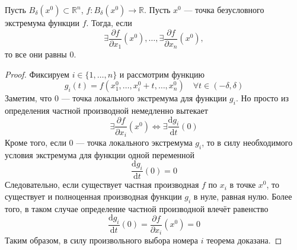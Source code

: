 \documentclass[11pt]{article}
\begin{document}
\begin{theorem}
    Пусть $B_{\delta} (x^0)\subset \mathbb{R}^n$, $f \colon B_{\delta} (x^0)\to \mathbb{R}$. Пусть $x^0$ --- точка безусловного экстремума функции $f$.
    Тогда, если
    \[\exists \frac{\partial f}{\partial x_1} (x^0), \ldots , \exists \frac{\partial f}{\partial x_n}(x^0),\]
    то все они равны $0$.
\end{theorem}

\begin{proof}
    Фиксируем $i\in \{1, \ldots ,n\}$ и рассмотрим функцию 
    \[g_i(t)= f(x_1^0, \ldots , x_{i}^0 + t, \ldots ,x_n^0) \quad \forall t \in (-\delta, \delta)\]
    Заметим, что $0$ --- точка локального экстремума для функции $g_i$. Но просто из определения частной производной немедленно вытекает
    \[ \exists \frac{\partial f}{\partial x_i} (x^0) \iff \exists \frac{\mathrm{d} g_i}{\mathrm{d} t} (0) \]
    Кроме того, если $0$ --- точка локального экстремума $g_i$, то в силу необходимого условия экстремума для функции одной переменной 
    \[\frac{\mathrm{d} g_i}{\mathrm{d} t} (0) = 0\]
    Следовательно, если существует частная производная $f$ по $x_i$ в точке $x^0$, то существует и полноценная производная функции $g_i$ в нуле, равная нулю. Более того, в таком случае определение частной производной влечёт равенство
    \[ \frac{\mathrm{d} g_i}{\mathrm{d} t} (0) = \frac{\partial f}{\partial x_i} (x^0) = 0 \]
    Таким образом, в силу произвольного выбора номера $i$ теорема доказана.
\end{proof}
\end{document}
